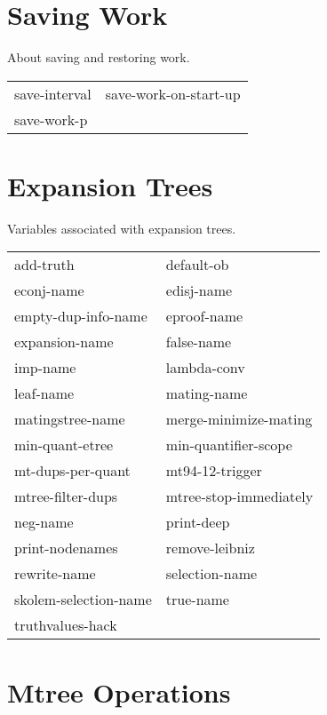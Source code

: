\section{Saving Work}

\begin{description} 
\item[SAVING-WORK]  
About saving and restoring work.

\begin{tabular}{l l}
save-interval&save-work-on-start-up\\
save-work-p
\end{tabular}
\item
\end{description}

\section{Expansion Trees}

\begin{description} 
\item[ETREES]  
Variables associated with expansion trees.

\begin{tabular}{l l}
add-truth&default-ob\\
econj-name&edisj-name\\
empty-dup-info-name&eproof-name\\
expansion-name&false-name\\
imp-name&lambda-conv\\
leaf-name&mating-name\\
matingstree-name&merge-minimize-mating\\
min-quant-etree&min-quantifier-scope\\
mt-dups-per-quant&mt94-12-trigger\\
mtree-filter-dups&mtree-stop-immediately\\
neg-name&print-deep\\
print-nodenames&remove-leibniz\\
rewrite-name&selection-name\\
skolem-selection-name&true-name\\
truthvalues-hack
\end{tabular}
\item
\end{description}

\section{Mtree Operations}

